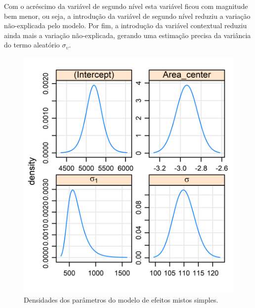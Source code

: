 \documentclass[
  a4paper, 11pt]{article}
\begin{document}
Com o acréscimo da variável de segundo nível esta variável ficou com
magnitude bem menor, ou seja, a introdução da variável de segundo nível
reduziu a variação não-explicada pelo modelo. Por fim, a introdução da
variável contextual reduziu ainda mais a variação não-explicada, gerando
uma estimação precisa da variância do termo aleatório
\(\sigma_\upsilon\).

\begin{figure}[H]

{\centering \includegraphics[width=0.5\linewidth]{images/pr-1} 

}

\caption{Densidades dos parâmetros do modelo de efeitos mistos simples.}\label{fig:pr}
\end{figure}
\end{document}
